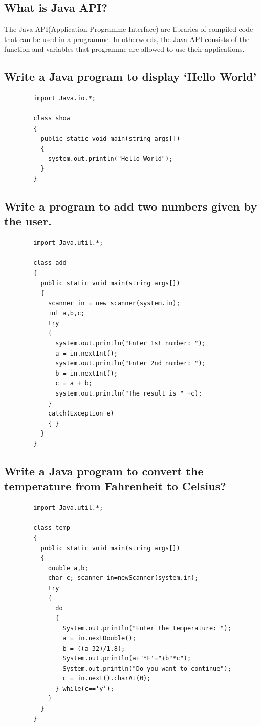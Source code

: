 \documentclass[11pt, a4paper]{book}
\begin{document}
    \subsection{What is Java API?}
      The Java API(Application Programme Interface) are libraries of compiled code that can be used in a programme. In otherwords, the Java API consists of the function and variables that programme are allowed to use their applications.
    
    \subsection{Write a Java program to display `Hello World'}
    
      \begin{lstlisting}
        import Java.io.*;
        
        class show
        {
          public static void main(string args[])
          {
            system.out.println("Hello World");
          }
        }
      \end{lstlisting}
    
    \subsection{Write a program to add two numbers given by the user.}
      \begin{lstlisting}
        import Java.util.*;
      
        class add
        {
          public static void main(string args[])
          {
            scanner in = new scanner(system.in);
            int a,b,c;
            try
            {
              system.out.println("Enter 1st number: ");
              a = in.nextInt();
              system.out.println("Enter 2nd number: ");
              b = in.nextInt();
              c = a + b;
              system.out.println("The result is " +c);
            }
            catch(Exception e)
            { }
          }
        }
      \end{lstlisting}
    
    \subsection{Write a Java program to convert the temperature from Fahrenheit to Celsius?}
      \begin{lstlisting}
        import Java.util.*;
        
        class temp 
        {
          public static void main(string args[])
          {
            double a,b;
            char c; scanner in=newScanner(system.in);
            try
            {
              do 
              {
                System.out.println("Enter the temperature: ");
                a = in.nextDouble();
                b = ((a-32)/1.8);
                System.out.println(a+"*F'="+b"*c");
                System.out.println("Do you want to continue");
                c = in.next().charAt(0);
              } while(c=='y');
            }
          }
        }
      \end{lstlisting}
    
\end{document}

